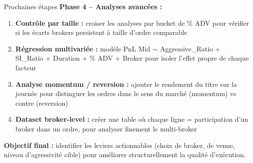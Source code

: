 \documentclass[10pt]{beamer}
\begin{document}
\begin{frame}{Prochaines étapes}
\textbf{Phase 4 -- Analyses avancées :}

\begin{enumerate}
    \item \textbf{Contrôle par taille :} croiser les analyses par bucket de \% ADV pour vérifier si les écarts brokers persistent à taille d'ordre comparable
    \item \textbf{Régression multivariée :} modèle PnL Mid $\sim$ Aggressive\_Ratio + SI\_Ratio + Duration + \% ADV + Broker pour isoler l'effet propre de chaque facteur
    \item \textbf{Analyse momentum / reversion :} ajouter le rendement du titre sur la journée pour distinguer les ordres dans le sens du marché (momentum) vs contre (reversion)
    \item \textbf{Dataset broker-level :} créer une table où chaque ligne = participation d'un broker dans un ordre, pour analyser finement le multi-broker
\end{enumerate}

\vspace{0.3cm}
\textbf{Objectif final :} identifier les leviers actionnables (choix de broker, de venue, niveau d'agressivité cible) pour améliorer structurellement la qualité d'exécution.
\end{frame}
\end{document}

